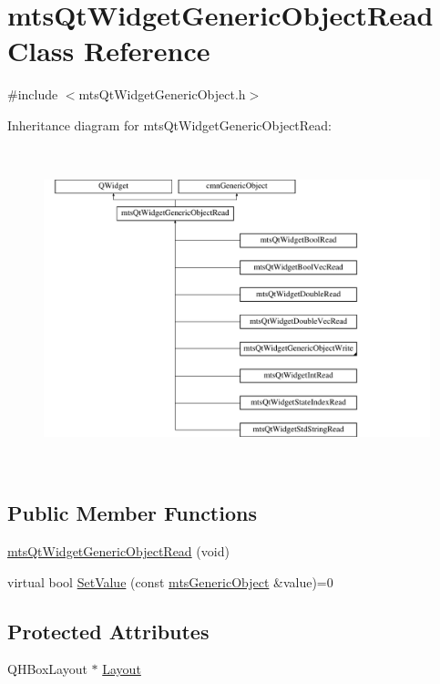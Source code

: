 \hypertarget{classmts_qt_widget_generic_object_read}{\section{mts\-Qt\-Widget\-Generic\-Object\-Read Class Reference}
\label{classmts_qt_widget_generic_object_read}
}


{\ttfamily \#include $<$mts\-Qt\-Widget\-Generic\-Object.\-h$>$}

Inheritance diagram for mts\-Qt\-Widget\-Generic\-Object\-Read\-:\begin{figure}[H]
\begin{center}
\leavevmode
\includegraphics[height=9.333333cm]{da/d99/classmts_qt_widget_generic_object_read}
\end{center}
\end{figure}
\subsection*{Public Member Functions}
\begin{DoxyCompactItemize}
\item 
\hyperlink{classmts_qt_widget_generic_object_read_aa7c657d78707c957c7887a5935b5e51f}{mts\-Qt\-Widget\-Generic\-Object\-Read} (void)
\item 
virtual bool \hyperlink{classmts_qt_widget_generic_object_read_ade3ec733d27e14609b2f95831a389658}{Set\-Value} (const \hyperlink{classmts_generic_object}{mts\-Generic\-Object} \&value)=0
\end{DoxyCompactItemize}
\subsection*{Protected Attributes}
\begin{DoxyCompactItemize}
\item 
Q\-H\-Box\-Layout $\ast$ \hyperlink{classmts_qt_widget_generic_object_read_ad10c07d124b999b3f16522a6c6eb3789}{Layout}
\end{DoxyCompactItemize}



